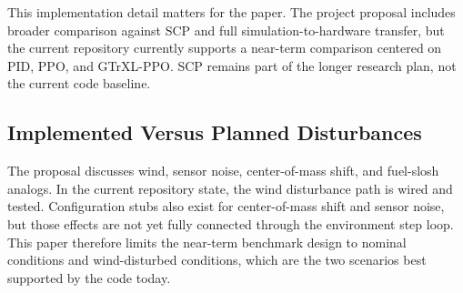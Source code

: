 \documentclass[10pt,twocolumn]{article}
\begin{document}
This implementation detail matters for the paper. The project proposal includes broader comparison against SCP and full simulation-to-hardware transfer, but the current repository currently supports a near-term comparison centered on PID, PPO, and GTrXL-PPO. SCP remains part of the longer research plan, not the current code baseline.

\subsection{Implemented Versus Planned Disturbances}

The proposal discusses wind, sensor noise, center-of-mass shift, and fuel-slosh analogs. In the current repository state, the wind disturbance path is wired and tested. Configuration stubs also exist for center-of-mass shift and sensor noise, but those effects are not yet fully connected through the environment step loop. This paper therefore limits the near-term benchmark design to nominal conditions and wind-disturbed conditions, which are the two scenarios best supported by the code today.
\end{document}
